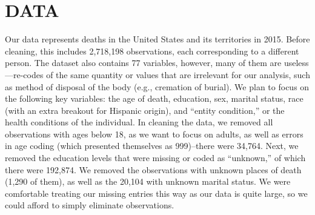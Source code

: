 \documentclass[letterpaper, 10 pt, conference]{ieeeconf}  %
\begin{document}
\section{DATA}
Our data represents deaths in the United States and its territories in 2015. Before cleaning, this includes 2,718,198 observations, each corresponding to a different person. The dataset also contains 77 variables, however, many of them are useless---re-codes of the same quantity or values that are irrelevant for our analysis, such as method of disposal of the body (e.g., cremation of burial). We plan to focus on the following key variables: the age of death, education, sex, marital status, race (with an extra breakout for Hispanic origin), and ``entity condition,'' or the health conditions of the individual. In cleaning the data, we removed all observations with ages below 18, as we want to focus on adults, as well as errors in age coding (which presented themselves as 999)--there were 34,764. Next, we removed the education levels that were missing or coded as ``unknown,'' of which there were 192,874. We removed the observations with unknown places of death (1,290 of them), as well as the 20,104 with unknown marital status. We were comfortable treating our missing entries this way as our data is quite large, so we could afford to simply eliminate observations.
\end{document}
